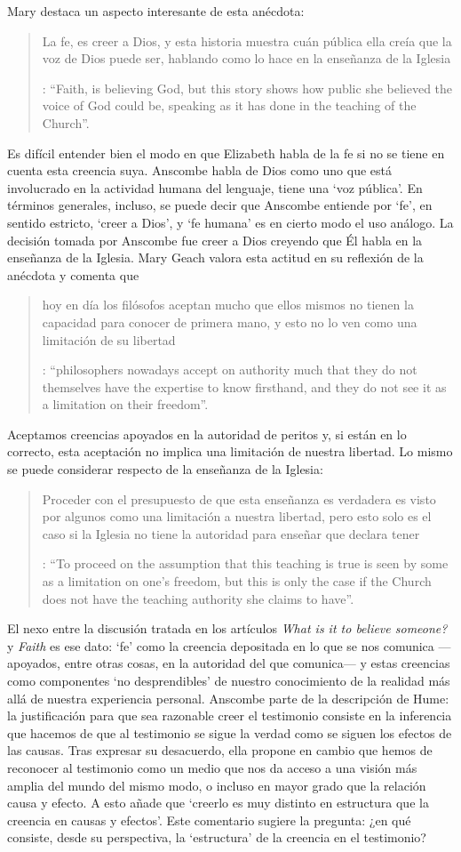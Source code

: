 Mary destaca un aspecto interesante de esta anécdota: \blockquote[{\Cite[xvi-xvii]{anscombe2008faith}}: \enquote{Faith, \textelp{} is believing God, but this story shows how public she believed the voice of God could be, speaking as it has done in the teaching of the Church}.]{La fe, \textelp{} es creer a Dios, y esta historia muestra cuán pública ella creía que la voz de Dios puede ser, hablando como lo hace en la enseñanza de la Iglesia}. Es difícil entender bien el modo en que Elizabeth habla de la fe si no se tiene en cuenta esta creencia suya. Anscombe habla de Dios como uno que está involucrado en la actividad humana del lenguaje, tiene una `voz pública'. En términos generales, incluso, se puede decir que Anscombe entiende por `fe', en sentido estricto, `creer a Dios', y `fe humana' es en cierto modo el uso análogo. La decisión tomada por Anscombe fue creer a Dios creyendo que Él habla en la enseñanza de la Iglesia. Mary Geach valora esta actitud en su reflexión de la anécdota y comenta que \blockquote[{\Cite[xvii]{anscombe2008faith}}: \enquote{philosophers nowadays accept on authority much that they do not themselves have the expertise to know firsthand, and they do not see it as a limitation on their freedom}.]{hoy en día los filósofos aceptan mucho que ellos mismos no tienen la capacidad para conocer de primera mano, y esto no lo ven como una limitación de su libertad}. Aceptamos creencias apoyados en la autoridad de peritos y, si están en lo correcto, esta aceptación no implica una limitación de nuestra libertad. Lo mismo se puede considerar respecto de la enseñanza de la Iglesia: \blockquote[{\Cite[xvi-xvii]{anscombe2008faith}}: \enquote{To proceed on the assumption that this teaching is true is seen by some as a limitation on one's freedom, but this is only the case if the Church does not have the teaching authority she claims to have}.]{Proceder con el presupuesto de que esta enseñanza es verdadera es visto por algunos como una limitación a nuestra libertad, pero esto solo es el caso si la Iglesia no tiene la autoridad para enseñar que declara tener}.

El nexo entre la discusión tratada en los artículos \emph{What is it to believe someone?} y \emph{Faith} es ese dato: `fe' como la creencia depositada en lo que se nos comunica ---apoyados, entre otras cosas, en la autoridad del que comunica--- y estas creencias como componentes `no desprendibles' de nuestro conocimiento de la realidad más allá de nuestra experiencia personal. Anscombe parte de la descripción de Hume: la justificación para que sea razonable creer el testimonio consiste en la inferencia que hacemos de que al testimonio se sigue la verdad como se siguen los efectos de las causas. Tras expresar su desacuerdo, ella propone en cambio que hemos de reconocer al testimonio como un medio que nos da acceso a una visión más amplia del mundo del mismo modo, o incluso en mayor grado que la relación causa y efecto. A esto añade que \enquote*{creerlo es muy distinto en estructura que la creencia en causas y efectos}. Este comentario sugiere la pregunta: ¿en qué consiste, desde su perspectiva, la `estructura' de la creencia en el testimonio?

